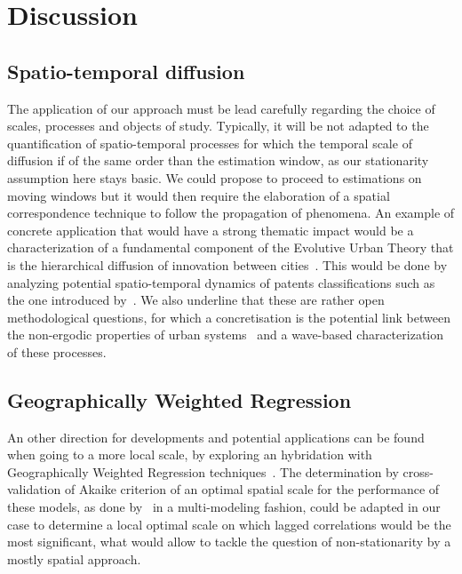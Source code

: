 \documentclass[english]{./sageo}
\begin{document}
\section{Discussion}


\subsection{Spatio-temporal diffusion}


The application of our approach must be lead carefully regarding the choice of scales, processes and objects of study. Typically, it will be not adapted to the quantification of spatio-temporal processes for which the temporal scale of diffusion if of the same order than the estimation window, as our stationarity assumption here stays basic. We could propose to proceed to estimations on moving windows but it would then require the elaboration of a spatial correspondence technique to follow the propagation of phenomena. An example of concrete application that would have a strong thematic impact would be a characterization of a fundamental component of the Evolutive Urban Theory that is the hierarchical diffusion of innovation between cities~\cite{pumain2010theorie}. This would be done by analyzing potential spatio-temporal dynamics of patents classifications such as the one introduced by~\cite{10.1371/journal.pone.0176310}. We also underline that these are rather open methodological questions, for which a concretisation is the potential link between the non-ergodic properties of urban systems~\cite{pumain2012urban} and a wave-based characterization of these processes.





\subsection{Geographically Weighted Regression}


An other direction for developments and potential applications can be found when going to a more local scale, by exploring an hybridation with Geographically Weighted Regression techniques~\cite{brunsdon1998geographically}. The determination by cross-validation of Akaike criterion of an optimal spatial scale for the performance of these models, as done by~\cite{2017arXiv170607467R} in a multi-modeling fashion, could be adapted in our case to determine a local optimal scale on which lagged correlations would be the most significant, what would allow to tackle the question of non-stationarity by a mostly spatial approach.
\end{document}
